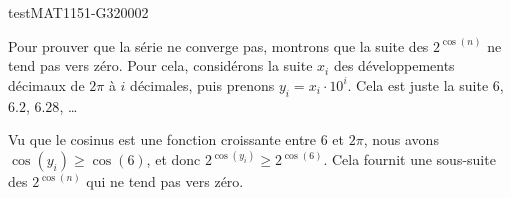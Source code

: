 \begin{corrige}{testMAT1151-G320002}



Pour prouver que la série ne converge pas, montrons que la suite des $2^{\cos(n)}$ ne tend pas vers zéro. Pour cela, considérons la suite $x_i$ des développements décimaux de $2\pi$ à $i$ décimales, puis prenons $y_i=x_i\cdot 10^i$. Cela est juste la suite $6$, $6.2$, $6.28$, \ldots

Vu que le cosinus est une fonction croissante entre $6$ et $2\pi$, nous avons $\cos(y_i)\geq\cos(6)$, et donc $2^{\cos(y_i)}\geq 2^{\cos(6)}$. Cela fournit une sous-suite des $2^{\cos(n)}$ qui ne tend pas vers zéro.

\end{corrige}
